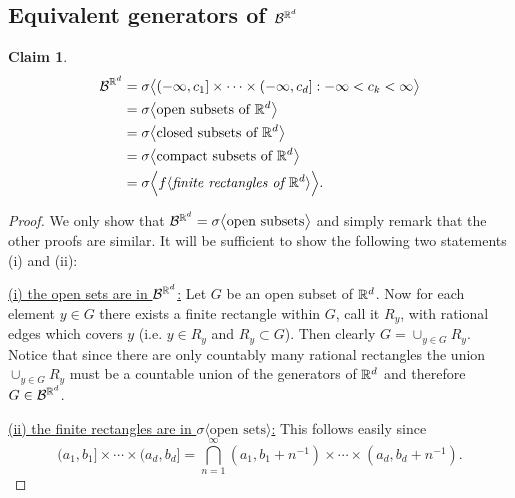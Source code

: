 \documentclass[10pt,letterpaper,twocolumn]{article}
\newtheorem{claim}{Claim}
\begin{document}
\subsection{Equivalent generators of $\mathcal B^{\Bbb R^d}$}
\label{equiv}

\begin{claim}
\begin{align}
\mathcal B^{\Bbb R^d}
& = \sigma\bigl\langle (-\infty,c_1]\times \cdots \times (-\infty, c_d]: -\infty < c_k< \infty \bigr\rangle \label{rrr}   \\
& = \sigma\bigl\langle \text{open subsets of $\Bbb R^d$}  \bigr\rangle  \\
& = \sigma\bigl\langle \text{closed subsets of $\Bbb R^d$}  \bigr\rangle\\
& = \sigma\bigl\langle \text{compact subsets of $\Bbb R^d$}  \bigr\rangle\\
&= \sigma \Bigl\langle f\langle \textit{finite rectangles of $\Bbb R^d$} \rangle\Bigr\rangle.
\end{align}
\end{claim}
\begin{proof}
 We only show that $\mathcal B^{\Bbb R^d} =  \sigma\bigl\langle \text{open subsets}\bigr\rangle$ and simply remark that the other proofs are similar. It will be sufficient to show the following two statements (i) and (ii):
 
 \vspace{.2cm}
\noindent
\underline{(i) the open sets are in $\mathcal B^{\Bbb R^d}$:} 
Let $G$ be an open subset of $\Bbb R^d$. Now for each element $y\in G$ there exists a finite rectangle within $G$, call it $R_y$, with rational edges which covers $y$ (i.e. $y\in R_y$ and $R_y\subset G$). Then clearly $G= \cup_{y\in G} R_y$. Notice that since there are only countably many rational rectangles the union $ \cup_{y\in G} R_y$ must be a countable union of the generators of $\Bbb R^d$ and therefore $G\in \mathcal B^{\Bbb R^d}$.

\vspace{.2cm}
\noindent
\underline{(ii) the finite rectangles are in $\sigma\bigl\langle \text{open sets}  \bigr\rangle$:} 
 This follows easily since 
\[ (a_1,b_1]\times \cdots \times (a_d,b_d] = \bigcap_{n=1}^\infty  (a_1,b_1+n^{-1})\times \cdots \times (a_d,b_d+n^{-1}). \]
\end{proof}
\end{document}
